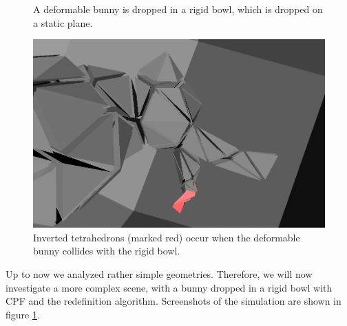 \begin{figure}[tbp]
\begin{minipage}[b]{0.33 \linewidth}
		\end{minipage}
		\begin{minipage}[b]{0.33 \linewidth}
			\centering
		\end{minipage}
				\caption{A deformable bunny is dropped in a rigid bowl, which is dropped on a static plane.}
				\label{fig::bunnyBowl}
\end{figure}

\begin{figure}[tbp]
		\centering
			       \includegraphics[width=0.4\linewidth]{pics/png/bunny_inverted.png} 
	
\caption{Inverted tetrahedrons (marked red) occur when the deformable bunny collides with the rigid bowl.}
\label{fig::bunny_inverted}
\end{figure}

Up to now we analyzed rather simple geometries. Therefore, we will now investigate a more complex scene, with a bunny dropped in a rigid bowl with CPF and the redefinition algorithm. Screenshots of the simulation are shown in figure \ref{fig::bunnyBowl}.

